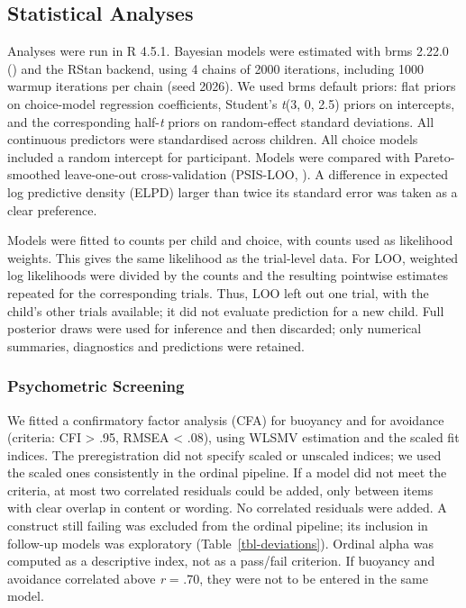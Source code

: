 \documentclass[
  man,
  floatsintext,
  longtable,
  nolmodern,
  notxfonts,
  notimes,
  colorlinks=true,linkcolor=blue,citecolor=blue,urlcolor=blue]{apa7}
\begin{document}
\subsection{Statistical Analyses}\label{statistical-analyses}

Analyses were run in R 4.5.1. Bayesian models were estimated with brms
2.22.0 () and the RStan
backend, using 4 chains of 2000 iterations, including 1000 warmup
iterations per chain (seed 2026). We used brms default priors: flat
priors on choice-model regression coefficients, Student's \emph{t}(3, 0,
2.5) priors on intercepts, and the corresponding half-\emph{t} priors on
random-effect standard deviations. All continuous predictors were
standardised across children. All choice models included a random
intercept for participant. Models were compared with Pareto-smoothed
leave-one-out cross-validation (PSIS-LOO,
). A difference in
expected log predictive density (ELPD) larger than twice its standard
error was taken as a clear preference.

Models were fitted to counts per child and choice, with counts used as
likelihood weights. This gives the same likelihood as the trial-level
data. For LOO, weighted log likelihoods were divided by the counts and
the resulting pointwise estimates repeated for the corresponding trials.
Thus, LOO left out one trial, with the child's other trials available;
it did not evaluate prediction for a new child. Full posterior draws
were used for inference and then discarded; only numerical summaries,
diagnostics and predictions were retained.

\subsubsection{Psychometric Screening}\label{psychometric-screening}

We fitted a confirmatory factor analysis (CFA) for buoyancy and for
avoidance (criteria: CFI \textgreater{} .95, RMSEA \textless{} .08),
using WLSMV estimation and the scaled fit indices. The preregistration
did not specify scaled or unscaled indices; we used the scaled ones
consistently in the ordinal pipeline. If a model did not meet the
criteria, at most two correlated residuals could be added, only between
items with clear overlap in content or wording. No correlated residuals
were added. A construct still failing was excluded from the ordinal
pipeline; its inclusion in follow-up models was exploratory
(Table~\ref{tbl-deviations}). Ordinal alpha was computed as a
descriptive index, not as a pass/fail criterion. If buoyancy and
avoidance correlated above \textbar{}\emph{r}\textbar{} = .70, they were
not to be entered in the same model.
\end{document}
